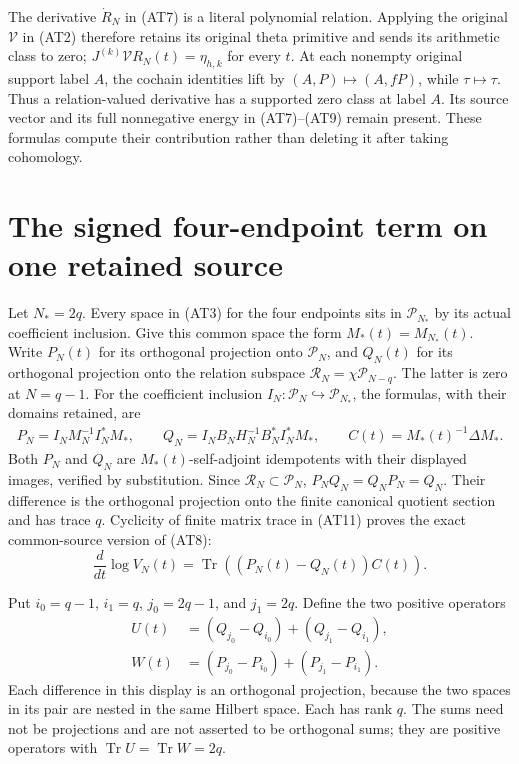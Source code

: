 \documentclass[11pt]{article}
\newcommand{\Tr}{\operatorname{Tr}}
\newcommand{\cP}{\mathcal P}
\newcommand{\cR}{\mathcal R}
\begin{document}
The derivative $\dot R_N$ in (AT7) is a literal polynomial relation.
Applying the original $\mathcal V$ in (AT2) therefore retains its
original theta primitive and sends its arithmetic class to zero;
$J^{(k)}\mathcal V R_N(t)=\eta_{h,k}$ for every $t$.
At each nonempty original support label $A$, the cochain identities
lift by $(A,P)\mapsto(A,fP)$, while $\tau\mapsto\tau$.
Thus a relation-valued derivative has a supported zero class at
label $A$. Its source vector and its full nonnegative energy in
(AT7)--(AT9) remain present. These formulas compute their
contribution rather than deleting it after taking cohomology.

\section{The signed four-endpoint term on one retained source}

Let $N_*=2q$. Every space in (AT3) for the four endpoints sits in
$\cP_{N_*}$ by its actual coefficient inclusion. Give this common
space the form $M_*(t)=M_{N_*}(t)$. Write $P_N(t)$ for its
orthogonal projection onto $\cP_N$, and $Q_N(t)$ for its
orthogonal projection onto the relation subspace
$\cR_N=\chi\cP_{N-q}$. The latter is zero at $N=q-1$.
For the coefficient inclusion $I_N:\cP_N\hookrightarrow\cP_{N_*}$,
the formulas, with their domains retained, are
\[
 \begin{gathered}
 P_N=I_NM_N^{-1}I_N^*M_*,\qquad
 Q_N=I_NB_NH_N^{-1}B_N^*I_N^*M_*,\qquad
 C(t)=M_*(t)^{-1}\Delta M_*.                   \tag{AT11}
 \end{gathered}
\]
Both $P_N$ and $Q_N$ are $M_*(t)$-self-adjoint idempotents with
their displayed images, verified by substitution. Since
$\cR_N\subset\cP_N$, $P_NQ_N=Q_NP_N=Q_N$. Their difference is
the orthogonal projection onto the finite canonical quotient
section and has trace $q$. Cyclicity of finite matrix trace in
(AT11) proves the exact common-source version of (AT8):
\[
 \frac{d}{dt}\log V_N(t)=\Tr((P_N(t)-Q_N(t))C(t)).
                                                        \tag{AT12}
\]

Put $i_0=q-1$, $i_1=q$, $j_0=2q-1$, and $j_1=2q$.
Define the two positive operators
\[
 \begin{split}
 U(t)&=(Q_{j_0}-Q_{i_0})+(Q_{j_1}-Q_{i_1}),\\
 W(t)&=(P_{j_0}-P_{i_0})+(P_{j_1}-P_{i_1}).    \tag{AT13}
 \end{split}
\]
Each difference in this display is an orthogonal projection,
because the two spaces in its pair are nested in the same
Hilbert space. Each has rank $q$. The sums need not be
projections and are not asserted to be orthogonal sums; they
are positive operators with $\Tr U=\Tr W=2q$.
\end{document}
